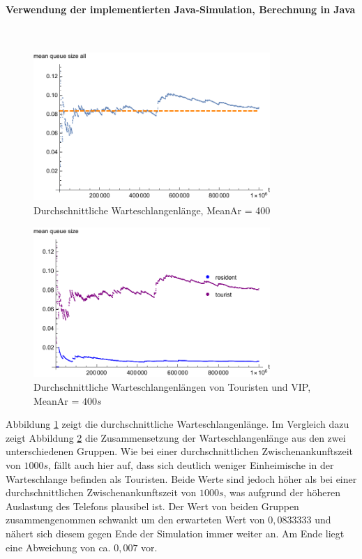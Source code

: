 \paragraph{Verwendung der implementierten Java-Simulation, Berechnung in Java}
\label{JavaVIPPhone400}
\\
\begin{figure}[htpb]
	\centering
	\includegraphics[width=0.8\textwidth]{abbildungen/1_Phone_VIP/Arrival_400_Serve_100_dur_1000000_Skip_0/MeanQueueSizeAll.pdf}
	\caption{Durchschnittliche Warteschlangenlänge, MeanAr = 400}
	\label{fig:MQSVIP400ALL}
\end{figure} 

\begin{figure}[htpb]
	\centering
	\includegraphics[width=0.8\textwidth]{abbildungen/1_Phone_VIP/Arrival_400_Serve_100_dur_1000000_Skip_0/MeanQueueSizeTouristAndResident.pdf}
	\caption{Durchschnittliche Warteschlangenlängen von Touristen und VIP, MeanAr = $400s$}
	\label{fig:MQSVIP400VGL}
\end{figure}

Abbildung \ref{fig:MQSVIP400ALL} zeigt die durchschnittliche Warteschlangenlänge. Im Vergleich dazu zeigt Abbildung \ref{fig:MQSVIP400VGL} die Zusammensetzung der Warteschlangenlänge aus den zwei unterschiedenen Gruppen. Wie bei einer durchschnittlichen Zwischenankunftszeit von $1000s$, fällt auch hier auf, dass sich deutlich weniger Einheimische in der Warteschlange befinden als Touristen. Beide Werte sind jedoch höher als bei einer durchschnittlichen Zwischenankunftszeit von $1000s$, was aufgrund der höheren Auslastung des Telefons plausibel ist. Der Wert von beiden Gruppen zusammengenommen schwankt um den erwarteten Wert von $0,0833333$ und nähert sich diesem gegen Ende der Simulation immer weiter an. Am Ende liegt eine Abweichung von ca. $0,007$ vor.

